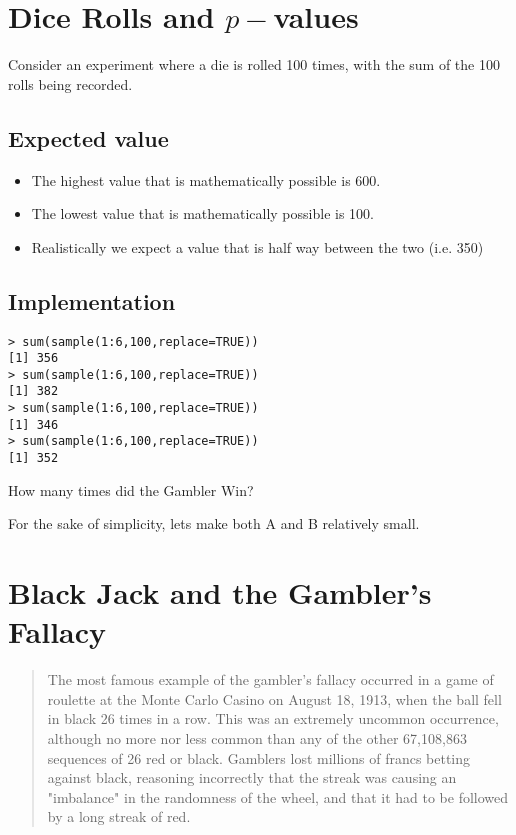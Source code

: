 \newpage
\section{Dice Rolls and $p-$values}
Consider an experiment where a die is rolled 100 times, with the sum of the 100 rolls being recorded.
\subsection{Expected value}
\begin{itemize}
\item The highest value that is mathematically possible is 600.
\item The lowest value that is mathematically possible is 100.
\item Realistically we expect a value that is half way between the two (i.e. 350)
\end{itemize}
\subsection{Implementation}
\begin{framed}
\begin{verbatim}
> sum(sample(1:6,100,replace=TRUE))
[1] 356
> sum(sample(1:6,100,replace=TRUE))
[1] 382
> sum(sample(1:6,100,replace=TRUE))
[1] 346
> sum(sample(1:6,100,replace=TRUE))
[1] 352
\end{verbatim}
\end{framed}


How many times did the Gambler Win?

For the sake of simplicity, lets make both A and B relatively small.

\newpage
\section{Black Jack and the Gambler's Fallacy}

\begin{quote}
The most famous example of the gambler's fallacy occurred in a game 
of roulette at the Monte Carlo Casino on August 18, 1913, when the ball fell in black 26 times in a row. This was an extremely uncommon occurrence, although no more nor less common than any of the other 67,108,863 sequences of 26 red or black. Gamblers lost millions of francs betting against black, reasoning incorrectly that the streak was causing an "imbalance" in the randomness of the wheel, and that it had to be followed by a long streak of red.
\end{quote}

